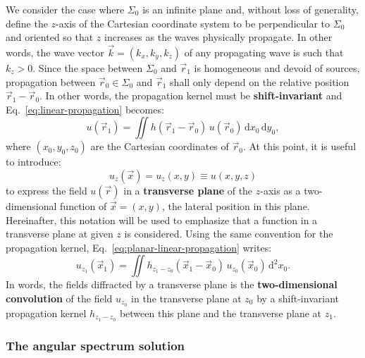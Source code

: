 \documentclass[a4paper]{article}
\newcommand*{\mathd}{\mathrm{d}}
\begin{document}
We consider the case where $\Sigma_{0}$ is an infinite plane and, without loss
of generality, define the $z$-axis of the Cartesian coordinate system to be
perpendicular to $\Sigma_{0}$ and oriented so that $z$ increases as the waves
physically propagate. In other words, the wave vector
$\vec{k} = (k_{x},k_{y},k_{z})$ of any propagating wave is such that
$k_{z} > 0$. Since the space between $\Sigma_{0}$ and $\vec{r}_{1}$ is
homogeneous and devoid of sources, propagation between
$\vec{r}_{0} ∈ \Sigma_{0}$ and $\vec{r}_{1}$ shall only depend on the relative
position $\vec{r}_{1} - \vec{r}_{0}$. In other words, the propagation kernel
must be \textbf{shift-invariant} and Eq.~\eqref{eq:linear-propagation} becomes:
\begin{equation}
  \label{eq:planar-linear-propagation}
  u(\vec{r}_{1}) = \iint h(\vec{r}_{1} - \vec{r}_{0})\,u(\vec{r}_{0})\,\mathd x_{0}\,\mathd y_{0},
\end{equation}
where $(x_{0},y_{0},z_{0})$ are the Cartesian coordinates of $\vec{r}_{0}$. At
this point, it is useful to introduce:
\begin{equation}
  \label{eq:u_z}
  u_{z}(\vec{x}) = u_{z}(x,y) ≡ u(x,y,z)
\end{equation}
to express the field $u(\vec{r})$ in a \textbf{transverse plane} of the
$z$-axis as a two-dimensional function of $\vec{x} = (x,y)$, the lateral
position in this plane. Hereinafter, this notation will be used to emphasize
that a function in a transverse plane at given $z$ is considered. Using the
same convention for the propagation kernel,
Eq.~\eqref{eq:planar-linear-propagation} writes:
\begin{equation}
  \label{eq:convolutive-propagation}
  u_{z_{1}}(\vec{x}_{1}) =
  \iint h_{z_{1} - z_{0}}(\vec{x}_{1} - \vec{x}_{0})\,
  u_{z_{0}}(\vec{x}_{0})\,\mathd^{2} x_{0}.
\end{equation}
In words, the fields diffracted by a transverse plane is the
\textbf{two-dimensional convolution} of the field $u_{z_{0}}$ in the transverse
plane at $z_{0}$ by a shift-invariant propagation kernel $h_{z_{1} - z_{0}}$
between this plane and the transverse plane at $z_{1}$.


\subsubsection{The angular spectrum solution}
\label{sec:angular-spectrum}
\end{document}
